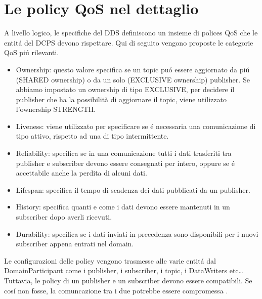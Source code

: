 \section{Le policy QoS nel dettaglio}
A livello logico, le specifiche del DDS
definiscono un insieme di polices QoS
che le entitá del DCPS devono rispettare. Qui di seguito vengono
proposte le categorie QoS piú rilevanti.
\begin{itemize}
    \item Ownership: questo valore specifica se un topic
    puó essere aggiornato da piú 
    (SHARED ownership) o da un solo (EXCLUSIVE ownership) publisher.
    Se abbiamo impostato un ownership di tipo EXCLUSIVE, per decidere il 
    publisher che ha la possibilità di aggiornare il topic, viene 
    utilizzato l'ownership STRENGTH.
    \item Liveness: viene utilizzato per specificare se é necessaria
    una comunicazione di tipo attivo, rispetto ad una di tipo 
    intermittente.
    \item Reliability: specifica se in una comunicazione tutti i dati
    trasferiti tra publisher e subscriber devono essere consegnati
    per intero, oppure
    se é accettabile anche la perdita di alcuni dati.
    \item Lifespan: specifica il tempo di scadenza dei dati pubblicati da 
    un publisher.
    \item History: specifica quanti e come i dati devono essere 
    mantenuti in un 
    subscriber dopo averli ricevuti.
    \item Durability: specifica se i dati inviati in precedenza sono
    disponibili per i nuovi subscriber appena entrati nel domain.
\end{itemize}
Le configurazioni 
delle policy vengono trasmesse alle varie entitá dal DomainParticipant
come i publisher, i subscriber, i topic, i DataWriters etc\dots
Tuttavia, le policy di un publisher e un subscriber devono essere compatibili.
Se cosí non fosse, la comuncazione tra i due potrebbe essere compromessa
\cite{Michaud2017Apr}.
\label{Le policy QoS nel dettaglio}



